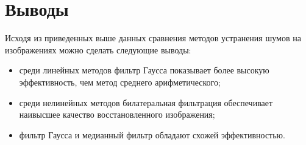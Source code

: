\section*{Выводы}
Исходя из приведенных выше данных сравнения методов устранения шумов на изображениях можно сделать следующие выводы:
\begin{itemize}
    \item среди линейных методов фильтр Гаусса показывает более высокую эффективность, чем метод среднего арифметического;
    \item среди нелинейных методов билатеральная фильтрация обеспечивает наивысшее качество восстановленного изображения;
    \item фильтр Гаусса и медианный фильтр обладают схожей эффективностью.
\end{itemize}